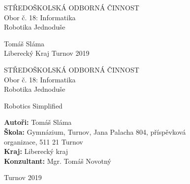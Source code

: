 \documentclass[a4paper, 12pt]{article}
\begin{document}

  \bfseries

  \begin{center}
    {\fontsize{18}{21.6} \selectfont STŘEDOŠKOLSKÁ ODBORNÁ ČINNOST}\\%
    \vspace*{\baselineskip}
    {\fontsize{14}{16.8} \selectfont Obor č. 18: Informatika}\\%

    \vspace{16em}
    {\fontsize{20}{24} \selectfont Robotika Jednoduše}%
    \vspace*{\fill}
  \end{center}

  \fontsize{16}{19.2} \selectfont
  Tomáš Sláma\\
  Liberecký Kraj
  \hfill
  Turnov 2019


  \newpage
  \begin{center}
    {\fontsize{18}{21.6} \selectfont STŘEDOŠKOLSKÁ ODBORNÁ ČINNOST}\\%
    \vspace*{\baselineskip}
{\fontsize{14}{16.8} \selectfont Obor č. 18: Informatika}\\%

    \vspace{10em}
    \fontsize{20}{24} \selectfont
    Robotika Jednoduše%

    Robotics Simplified%
    \vspace*{\fill}
  \end{center}

  \normalfont
  \fontsize{16}{19.6} \selectfont

  \textbf{Autoři:} Tomáš Sláma\\
  \textbf{Škola:} Gymnázium, Turnov, Jana Palacha 804, příspěvková \\ organizace, 511 21 Turnov \\
  \textbf{Kraj:} Liberecký kraj \\
  \textbf{Konzultant:} Mgr. Tomáš Novotný

  \vspace{\baselineskip}

  \fontsize{12}{14.4} \selectfont
  Turnov 2019
\end{document}
